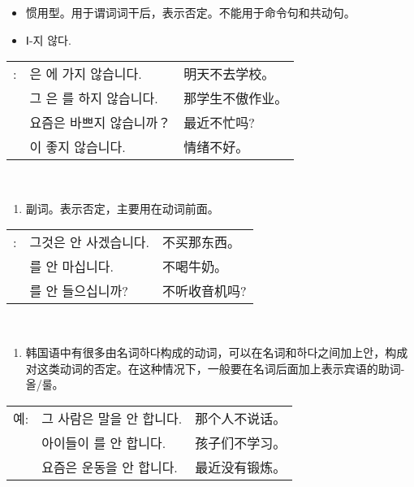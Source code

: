\begin{grammar}
	\begin{grammarsect}[-지 않다]
		\begin{itemize}
			\item 惯用型。用于谓词词干后，表示否定。不能用于命令句和共动句。
			\item {\color{gray} Ⅰ-지 않다.}
		\end{itemize}
		\begin{tabular}{lll}
			\ruby{例}{예}: & \ruby{來日}{내일}은 \ruby{學校}{학교}에 가지 않습니다.   & 明天不去学校。  \\
			             & 그 \ruby{學生}{학생}은 \ruby{宿題}{숙제}를 하지 않습니다. & 那学生不傲作业。 \\
			             & 요즘은 바쁘지 않습니까？                            & 最近不忙吗?   \\
			             & \ruby{氣分}{기분}이 좋지 않습니다.                  & 情绪不好。    \\
		\end{tabular}\\
	\end{grammarsect}
	\begin{grammarsect}[안]
		\begin{enumerate}
			\item 副词。表示否定，主要用在动词前面。
		\end{enumerate}
		\begin{tabular}{lll}
			\ruby{例}{예}: & 그것은 안 사겠습니다.                & 不买那东西。  \\
			             & \ruby{牛乳}{우유}를 안 마십니다.      & 不喝牛奶。   \\
			             & \ruby{라디오}{radio}를 안 들으십니까? & 不听收音机吗? \\
		\end{tabular}\\
	\end{grammarsect}
	\begin{enumerate}
		\item 韩国语中有很多由名词하다构成的动词，可以在名词和하다之间加上안，构成对这类动词的否定。在这种情况下，一般要在名词后面加上表示宾语的助词-올/룰。
	\end{enumerate}
	\begin{tabular}{lll}
		\ruby{例}{예}예: & 그 사람은 말을 안 합니다.             & 那个人不说话。 \\
		              & 아이들이 \ruby{工夫}{공부}를 안 합니다.  & 孩子们不学习。 \\
		              & 요즘은 \ruby{運動}{운동}운동을 안 합니다. & 最近没有锻炼。 \\
	\end{tabular}\\
\end{grammar}
